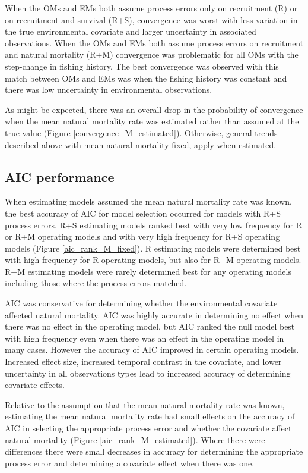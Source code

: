 \documentclass[
  12pt,
]{article}
\begin{document}
When the OMs and EMs both assume process errors only on recruitment (R)
or on recruitment and survival (R+S), convergence was worst with less
variation in the true environmental covariate and larger uncertainty in
associated observations. When the OMs and EMs both assume process errors
on recruitment and natural mortality (R+M) convergence was problematic
for all OMs with the step-change in fishing history. The best
convergence was observed with this match between OMs and EMs was when
the fishing history was constant and there was low uncertainty in
environmental observations.

As might be expected, there was an overall drop in the probability of
convergence when the mean natural mortality rate was estimated rather
than assumed at the true value (Figure \ref{convergence_M_estimated}).
Otherwise, general trends described above with mean natural mortality
fixed, apply when estimated.

\hypertarget{aic-performance}{%
\subsection*{AIC performance}\label{aic-performance}}

When estimating models assumed the mean natural mortality rate was
known, the best accuracy of AIC for model selection occurred for models
with R+S process errors. R+S estimating models ranked best with very low
frequency for R or R+M operating models and with very high frequency for
R+S operating models (Figure \ref{aic_rank_M_fixed}). R estimating
models were determined best with high frequency for R operating models,
but also for R+M operating models. R+M estimating models were rarely
determined best for any operating models including those where the
process errors matched.

AIC was conservative for determining whether the environmental covariate
affected natural mortality. AIC was highly accurate in determining no
effect when there was no effect in the operating model, but AIC ranked
the null model best with high frequency even when there was an effect in
the operating model in many cases. However the accuracy of AIC improved
in certain operating models. Increased effect size, increased temporal
contrast in the covariate, and lower uncertainty in all observations
types lead to increased accuracy of determining covariate effects.

Relative to the assumption that the mean natural mortality rate was
known, estimating the mean natural mortality rate had small effects on
the accuracy of AIC in selecting the appropriate process error and
whether the covariate affect natural mortality (Figure
\ref{aic_rank_M_estimated}). Where there were differences there were
small decreases in accuracy for determining the appropriate process
error and determining a covariate effect when there was one.
\end{document}
